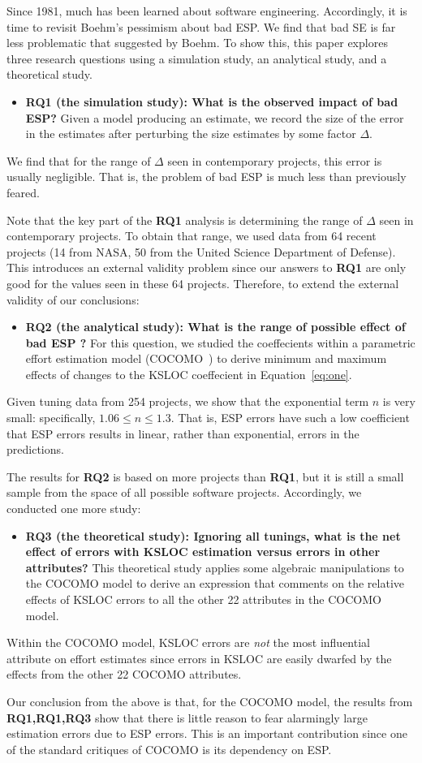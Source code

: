 \documentclass[final,twocolumn,5p]{elsarticle}
\newcommand{\bi}{\begin{itemize}[leftmargin=0.4cm]}
\newcommand{\ei}{\end{itemize}}
\newcommand{\eq}[1]{Equation~\ref{eq:#1}}
\theoremstyle{break}
\begin{document}
Since 1981, much has been learned about software
engineering. Accordingly, it is time to revisit
Boehm's pessimism about bad ESP.  We find that bad SE is far less problematic that suggested
by Boehm.
To show this, this paper explores three research questions
using a simulation study, an analytical study, and a theoretical study.
\bi
\item
{\bf RQ1 (the simulation study): What is the observed impact of bad ESP? }
Given a model producing an estimate, we record the size of the error
in the estimates
after perturbing the size estimates by some factor $\Delta$.
\ei
\begin{lesson}
We find that for the range of $\Delta$ seen in contemporary projects, this error
is usually negligible. That is, 
the
problem of bad ESP is much less than previously
feared.
\end{lesson}
Note that the key part of the {\bf RQ1} analysis is determining the
range of $\Delta$ seen in contemporary projects.
To obtain that range, we used data from 64 recent projects (14 from NASA, 50 
from the United Science Department of Defense). 
This introduces an external validity problem since our answers to {\bf RQ1} are
only good for the values seen in these 64 projects. Therefore, to extend the external
validity of our conclusions:
\bi
\item
{\bf RQ2 (the analytical study):   What is the range of possible effect of bad ESP ?}
For this question, we studied the coeffecients within a parametric effort
estimation model (COCOMO~\cite{boehm81,boehm00b})  to derive minimum and maximum
effects of changes to the KSLOC coeffecient in \eq{one}.
\ei
\begin{lesson}
Given tuning data  from 254 projects, we show that the
  exponential term $n$ is very small: specifically,
  \mbox{$1.06 \le n \le 1.3$}. That is, ESP errors have such a low coefficient that ESP errors
  results in linear, rather than exponential, errors in the predictions.
  \end{lesson}
 The results for {\bf RQ2} is based on more projects than {\bf RQ1}, but it is still
 a small sample from the space of all possible software projects. Accordingly, we conducted
 one more study:
  \bi
  \item
  {\bf RQ3 (the theoretical study): Ignoring all tunings, what is the net
    effect of errors with KSLOC estimation versus errors in other attributes?}
 This theoretical study applies some algebraic manipulations to the COCOMO model
 to derive an expression that comments on the relative effects of KSLOC errors
 to all the other 22 attributes in the COCOMO model.
 \ei
 \begin{lesson}
  Within the COCOMO model,
  KSLOC errors are {\em not} the most influential attribute on effort estimates
 since errors in KSLOC are easily
 dwarfed  by the effects from the other 22 COCOMO attributes.
 \end{lesson}
 Our conclusion from the above is that,
 for the COCOMO model, the results from {\bf RQ1,RQ1,RQ3}  show that there is little reason
  to fear alarmingly large estimation errors due to ESP errors. This is an important contribution since
  one of the standard critiques of COCOMO is its dependency on ESP.
\end{document}
